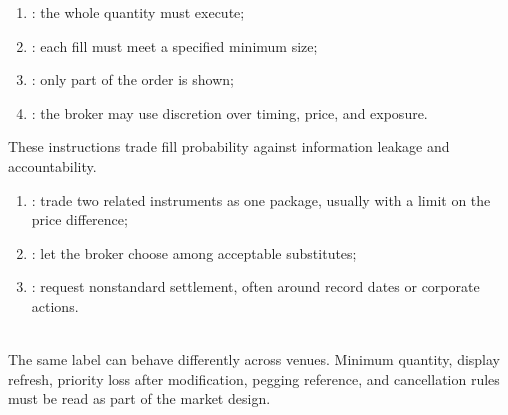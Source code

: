 \documentclass[a4paper,oneside,openany]{book}
\begin{document}
\begin{taxonomy} 
\begin{enumerate}[label=\roman*.]
\setlength{\itemsep}{0pt}
\item {}: the whole quantity must execute;
\item {}: each fill must meet a specified minimum size;
\item {}: only part of the order is shown;
\item {}: the broker may use discretion over timing, price, and exposure.
\end{enumerate}
These instructions trade fill probability against information leakage and accountability.
\end{taxonomy}

\begin{taxonomy} 
\begin{enumerate}[label=\roman*.]
\setlength{\itemsep}{0pt}
\item {}: trade two related instruments as one package, usually with a limit on the price difference;
\item {}: let the broker choose among acceptable substitutes;
\item {}: request nonstandard settlement, often around record dates or corporate actions.
\end{enumerate}
\end{taxonomy}

\begin{caveat} \\
The same label can behave differently across venues. Minimum quantity, display refresh, priority loss after modification, pegging reference, and cancellation rules must be read as part of the market design.
\end{caveat}
\end{document}
